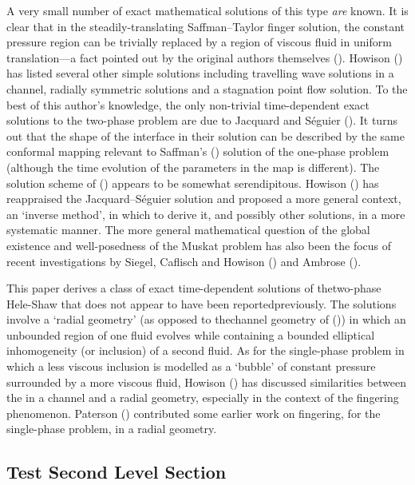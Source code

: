 \documentclass{article}
\begin{document}
A very small number of exact mathematical solutions of this type {\em are} known. It is clear that in the steadily-translating Saffman--Taylor finger
solution, the constant pressure region can be trivially replaced by
a region of viscous fluid in uniform translation---a fact
pointed out by the original authors themselves (\citealt{ST}).
Howison (\citealt{Howison}) has listed several other simple solutions including
travelling wave solutions in a channel, radially symmetric
solutions and a stagnation point flow solution. To the best of this author's knowledge, the only non-trivial time-dependent exact solutions to the two-phase problem are due to Jacquard and S\'eguier (\citealt{JS}). It turns out that the shape of the interface in their solution can be described by the same conformal mapping relevant to Saffman's (\citealt{PGS2}) solution of the one-phase problem
(although the time evolution of the parameters in the map
is different). The solution scheme of (\citealt{JS}) appears to
be somewhat serendipitous. Howison (\citealt{Howison}) has reappraised the Jacquard--S\'eguier
solution and proposed a more general context, an `inverse method', 
in which to derive it, and possibly other solutions,
in a more systematic manner. The more general mathematical
question of the global existence and well-posedness of the Muskat
problem has also been the focus of recent investigations by Siegel, Caflisch and Howison (\citealt{Sieg}) and Ambrose (\citealt{Ambrose}).

This paper derives a class of exact time-dependent solutions of the\break two-phase Hele-Shaw  that does not appear to have been reported\break previously.
The solutions involve a `radial geometry' (as opposed
to the\break channel geometry of (\citealt{JS})) in which 
an unbounded region of one fluid evolves 
while containing a bounded elliptical inhomogeneity
(or inclusion) of a second fluid.
As for the single-phase problem in which a
less viscous inclusion is modelled as a `bubble' of constant
pressure surrounded by a 
more viscous fluid, Howison (\citealt{How10}) has discussed similarities
between the  in a channel and a radial 
geometry, especially in the context of the fingering
phenomenon. Paterson (\citealt{Pat}) contributed some earlier work
on fingering, for the single-phase problem, in a radial geometry.

\subsection{Test Second Level Section}
\end{document}
